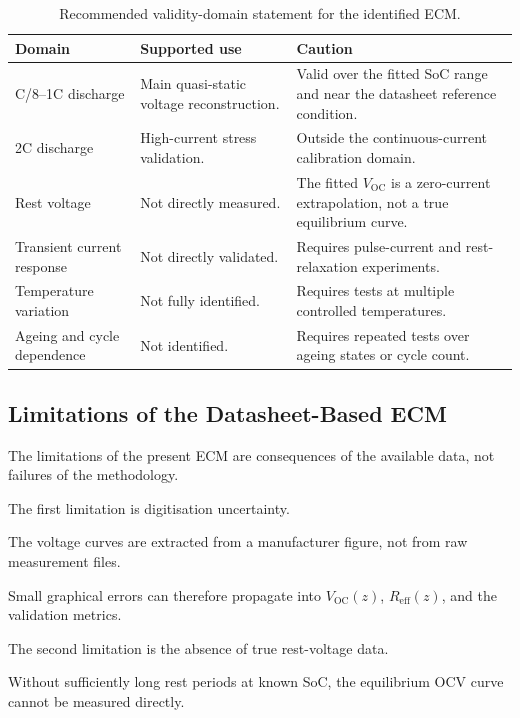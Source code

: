 \documentclass[a4paper,12pt]{article}
\begin{document}
\begin{table}[H]
\centering
\caption{Recommended validity-domain statement for the identified ECM.}
\label{tab:interp_validity_domains}
\begin{tabularx}{0.98\textwidth}{@{}L{0.27\textwidth}Y Y@{}}
\toprule
\textbf{Domain} &
\textbf{Supported use} &
\textbf{Caution} \\
\midrule
C/8--1C discharge &
Main quasi-static voltage reconstruction. &
Valid over the fitted SoC range and near the datasheet reference condition. \\
2C discharge &
High-current stress validation. &
Outside the continuous-current calibration domain. \\
Rest voltage &
Not directly measured. &
The fitted \(V_{\mathrm{OC}}\) is a zero-current extrapolation, not a true equilibrium curve. \\
Transient current response &
Not directly validated. &
Requires pulse-current and rest-relaxation experiments. \\
Temperature variation &
Not fully identified. &
Requires tests at multiple controlled temperatures. \\
Ageing and cycle dependence &
Not identified. &
Requires repeated tests over ageing states or cycle count. \\
\bottomrule
\end{tabularx}
\end{table}

\subsection{Limitations of the Datasheet-Based ECM}

The limitations of the present ECM are consequences of the available data, not failures of the methodology.

The first limitation is digitisation uncertainty.

The voltage curves are extracted from a manufacturer figure, not from raw measurement files.

Small graphical errors can therefore propagate into \(V_{\mathrm{OC}}(z)\), \(R_{\mathrm{eff}}(z)\), and the validation metrics.

The second limitation is the absence of true rest-voltage data.

Without sufficiently long rest periods at known SoC, the equilibrium OCV curve cannot be measured directly.
\end{document}
